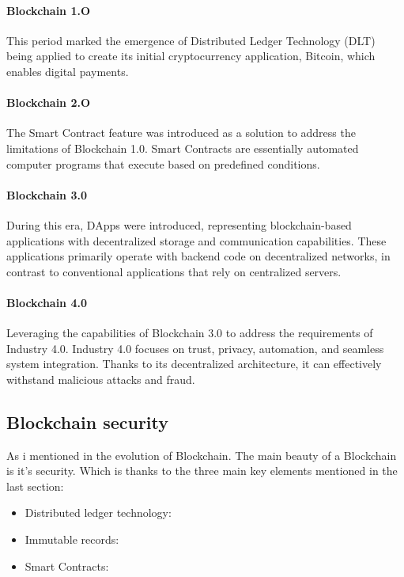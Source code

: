 \documentclass[10pt,english,a4paper]{article}
\begin{document}
\paragraph{Blockchain 1.O}
This period marked the emergence of Distributed Ledger Technology (DLT) being applied to create its initial cryptocurrency application, Bitcoin, which enables digital payments.
\cite{Suroso:SKCK}
\paragraph{Blockchain 2.O}
The Smart Contract feature was introduced as a solution to address the limitations of Blockchain 1.0. Smart Contracts are essentially automated computer programs that execute based on predefined conditions.
\cite{Suroso:SKCK}
\paragraph{Blockchain 3.0}
During this era, DApps were introduced, representing blockchain-based applications with decentralized storage and communication capabilities. These applications primarily operate with backend code on decentralized networks, in contrast to conventional applications that rely on centralized servers.
\cite{Suroso:SKCK}
\paragraph{Blockchain 4.0}
Leveraging the capabilities of Blockchain 3.0 to address the requirements of Industry 4.0. Industry 4.0 focuses on trust, privacy, automation, and seamless system integration. Thanks to its decentralized architecture, it can effectively withstand malicious attacks and fraud.
\cite{Suroso:SKCK}

\subsection{Blockchain security}
As i mentioned in the evolution of Blockchain. The main beauty of a Blockchain is it's security. Which is thanks to the three main key elements mentioned in the last section:

\begin{itemize}
    \item Distributed ledger technology:
    \item Immutable records:
    \item Smart Contracts:
\end{itemize}
   
\end{document}
